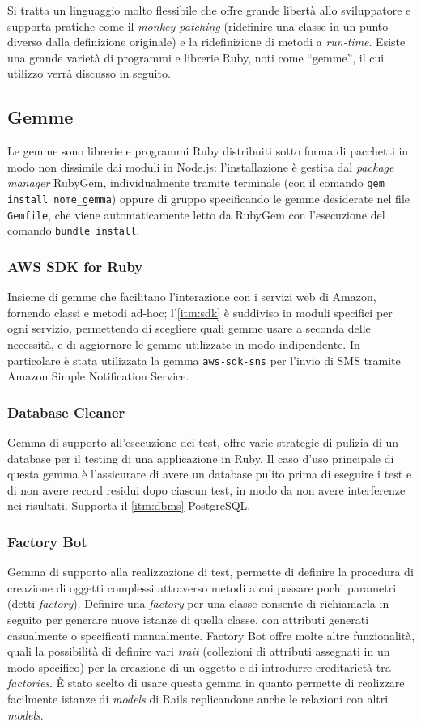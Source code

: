 Si tratta un linguaggio molto flessibile che offre grande libertà allo sviluppatore e supporta pratiche come il \textit{monkey patching} (ridefinire una classe in un punto diverso dalla definizione originale) e la ridefinizione di metodi a \textit{run-time}.
Esiste una grande varietà di programmi e librerie Ruby, noti come ``gemme'', il cui utilizzo verrà discusso in seguito.    
\subsection{Gemme}
Le gemme sono librerie e programmi Ruby distribuiti sotto forma di pacchetti in modo non dissimile dai moduli in Node.js: l'installazione è gestita dal \textit{package manager} RubyGem, individualmente tramite terminale (con il comando \texttt{gem install nome\_gemma}) oppure di gruppo specificando le gemme desiderate nel file \texttt{Gemfile}, che viene automaticamente letto da RubyGem con l'esecuzione del comando \texttt{bundle install}.

\subsubsection{AWS SDK for Ruby}
Insieme di gemme che facilitano l'interazione con i servizi web di Amazon, fornendo classi e metodi ad-hoc; l'\ref{itm:sdk} è suddiviso in moduli specifici per ogni servizio, permettendo di scegliere quali gemme usare a seconda delle necessità, e di aggiornare le gemme utilizzate in modo indipendente. In particolare è stata utilizzata la gemma \texttt{aws-sdk-sns} per l'invio di SMS tramite Amazon Simple Notification Service.

\subsubsection{Database Cleaner}
Gemma di supporto all'esecuzione dei test, offre varie strategie di pulizia di un database per il testing di una applicazione in Ruby. Il caso d'uso principale di questa gemma è l'assicurare di avere un database pulito prima di eseguire i test e di non avere record residui dopo ciascun test, in modo da non avere interferenze nei risultati. Supporta il \ref{itm:dbms} PostgreSQL.

\subsubsection{Factory Bot}
Gemma di supporto alla realizzazione di test, permette di definire la procedura di creazione di oggetti complessi attraverso metodi a cui passare pochi parametri (detti \textit{factory}). Definire una \textit{factory} per una classe consente di richiamarla in seguito per generare nuove istanze di quella classe, con attributi generati casualmente o specificati manualmente. Factory Bot offre molte altre funzionalità, quali la possibilità di definire vari \textit{trait} (collezioni di attributi assegnati in un modo specifico) per la creazione di un oggetto e di introdurre ereditarietà tra \textit{factories}. È stato scelto di usare questa gemma in quanto permette di realizzare facilmente istanze di \textit{models} di Rails replicandone anche le relazioni con altri \textit{models}. 

